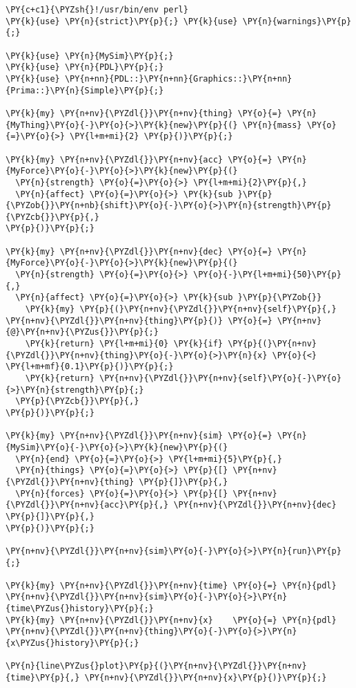 \begin{Verbatim}[commandchars=\\\{\}]
\PY{c+c1}{\PYZsh{}!/usr/bin/env perl}
\PY{k}{use} \PY{n}{strict}\PY{p}{;} \PY{k}{use} \PY{n}{warnings}\PY{p}{;}

\PY{k}{use} \PY{n}{MySim}\PY{p}{;}
\PY{k}{use} \PY{n}{PDL}\PY{p}{;}
\PY{k}{use} \PY{n+nn}{PDL::}\PY{n+nn}{Graphics::}\PY{n+nn}{Prima::}\PY{n}{Simple}\PY{p}{;}

\PY{k}{my} \PY{n+nv}{\PYZdl{}}\PY{n+nv}{thing} \PY{o}{=} \PY{n}{MyThing}\PY{o}{-}\PY{o}{>}\PY{k}{new}\PY{p}{(} \PY{n}{mass} \PY{o}{=}\PY{o}{>} \PY{l+m+mi}{2} \PY{p}{)}\PY{p}{;}

\PY{k}{my} \PY{n+nv}{\PYZdl{}}\PY{n+nv}{acc} \PY{o}{=} \PY{n}{MyForce}\PY{o}{-}\PY{o}{>}\PY{k}{new}\PY{p}{(}
  \PY{n}{strength} \PY{o}{=}\PY{o}{>} \PY{l+m+mi}{2}\PY{p}{,}
  \PY{n}{affect} \PY{o}{=}\PY{o}{>} \PY{k}{sub }\PY{p}{\PYZob{}}\PY{n+nb}{shift}\PY{o}{-}\PY{o}{>}\PY{n}{strength}\PY{p}{\PYZcb{}}\PY{p}{,}
\PY{p}{)}\PY{p}{;}

\PY{k}{my} \PY{n+nv}{\PYZdl{}}\PY{n+nv}{dec} \PY{o}{=} \PY{n}{MyForce}\PY{o}{-}\PY{o}{>}\PY{k}{new}\PY{p}{(}
  \PY{n}{strength} \PY{o}{=}\PY{o}{>} \PY{o}{-}\PY{l+m+mi}{50}\PY{p}{,}
  \PY{n}{affect} \PY{o}{=}\PY{o}{>} \PY{k}{sub }\PY{p}{\PYZob{}}
    \PY{k}{my} \PY{p}{(}\PY{n+nv}{\PYZdl{}}\PY{n+nv}{self}\PY{p}{,} \PY{n+nv}{\PYZdl{}}\PY{n+nv}{thing}\PY{p}{)} \PY{o}{=} \PY{n+nv}{@}\PY{n+nv}{\PYZus{}}\PY{p}{;}
    \PY{k}{return} \PY{l+m+mi}{0} \PY{k}{if} \PY{p}{(}\PY{n+nv}{\PYZdl{}}\PY{n+nv}{thing}\PY{o}{-}\PY{o}{>}\PY{n}{x} \PY{o}{<} \PY{l+m+mf}{0.1}\PY{p}{)}\PY{p}{;}
    \PY{k}{return} \PY{n+nv}{\PYZdl{}}\PY{n+nv}{self}\PY{o}{-}\PY{o}{>}\PY{n}{strength}\PY{p}{;}
  \PY{p}{\PYZcb{}}\PY{p}{,}
\PY{p}{)}\PY{p}{;}

\PY{k}{my} \PY{n+nv}{\PYZdl{}}\PY{n+nv}{sim} \PY{o}{=} \PY{n}{MySim}\PY{o}{-}\PY{o}{>}\PY{k}{new}\PY{p}{(}
  \PY{n}{end} \PY{o}{=}\PY{o}{>} \PY{l+m+mi}{5}\PY{p}{,}
  \PY{n}{things} \PY{o}{=}\PY{o}{>} \PY{p}{[} \PY{n+nv}{\PYZdl{}}\PY{n+nv}{thing} \PY{p}{]}\PY{p}{,}
  \PY{n}{forces} \PY{o}{=}\PY{o}{>} \PY{p}{[} \PY{n+nv}{\PYZdl{}}\PY{n+nv}{acc}\PY{p}{,} \PY{n+nv}{\PYZdl{}}\PY{n+nv}{dec} \PY{p}{]}\PY{p}{,}
\PY{p}{)}\PY{p}{;}

\PY{n+nv}{\PYZdl{}}\PY{n+nv}{sim}\PY{o}{-}\PY{o}{>}\PY{n}{run}\PY{p}{;}

\PY{k}{my} \PY{n+nv}{\PYZdl{}}\PY{n+nv}{time} \PY{o}{=} \PY{n}{pdl} \PY{n+nv}{\PYZdl{}}\PY{n+nv}{sim}\PY{o}{-}\PY{o}{>}\PY{n}{time\PYZus{}history}\PY{p}{;}
\PY{k}{my} \PY{n+nv}{\PYZdl{}}\PY{n+nv}{x}    \PY{o}{=} \PY{n}{pdl} \PY{n+nv}{\PYZdl{}}\PY{n+nv}{thing}\PY{o}{-}\PY{o}{>}\PY{n}{x\PYZus{}history}\PY{p}{;}

\PY{n}{line\PYZus{}plot}\PY{p}{(}\PY{n+nv}{\PYZdl{}}\PY{n+nv}{time}\PY{p}{,} \PY{n+nv}{\PYZdl{}}\PY{n+nv}{x}\PY{p}{)}\PY{p}{;}
\end{Verbatim}
